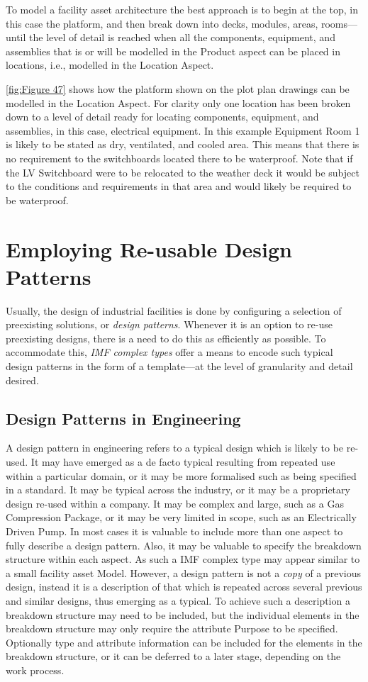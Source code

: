 \documentclass[../main.tex]{subfiles}
\begin{document}
To model a facility asset architecture the best approach is to begin at the top, in this case the platform, and then
break down into decks, modules, areas, rooms---until the level of detail is reached when all the components,
equipment, and assemblies that is or will be modelled in the Product aspect can be placed in locations, i.e.,
modelled in the Location Aspect.

\autoref{fig:Figure 47} shows how the platform shown on the plot plan drawings can be modelled in the Location Aspect. For clarity only
one location has been broken down to a level of detail ready for locating components, equipment, and assemblies, in
this case, electrical equipment. In this example Equipment Room 1 is likely to be stated as dry, ventilated, and
cooled area. This means that there is no requirement to the switchboards located there to be waterproof. Note that if
the LV Switchboard were to be relocated to the weather deck it would be subject to the conditions and requirements in
that area and would likely be required to be waterproof.

\section{Employing Re-usable Design Patterns}
\label{sec: Employing Re-usable Design Patterns}
Usually, the design of industrial facilities is done by configuring a selection of
preexisting solutions, or \emph{design patterns}. Whenever it is an option to re-use preexisting designs, there
is a need to do this as efficiently as possible. To accommodate this, \emph{IMF complex types} offer a means to encode such
typical design patterns in the form of a template---at the level of granularity and detail desired.

\subsection{Design Patterns in Engineering}
A design pattern in engineering refers to a typical design which is likely to be re-used.
It may have emerged as a de facto typical resulting from repeated use within a particular domain, or it may be more
formalised such as being specified in a standard. It may be typical across the industry, or it may be a proprietary
design re-used within a company. It may be complex and large, such as a Gas Compression Package, or it may be very
limited in scope, such as an Electrically Driven Pump. In most cases it is valuable to include more than one aspect
to fully describe a design pattern. Also, it may be valuable to specify the breakdown structure within each aspect.
As such a IMF complex type may appear similar to a small facility asset Model. However, a design pattern is not a \emph{copy} of a
previous design, instead it is a description of that which is repeated across several previous and similar designs,
thus emerging as a typical. To achieve such a description a breakdown structure may need to be included, but the
individual elements in the breakdown structure may only require the attribute Purpose to be specified.
Optionally type and attribute information can be included for the elements in the breakdown structure, or it can be deferred to a later stage, depending on the work
process.
\end{document}
